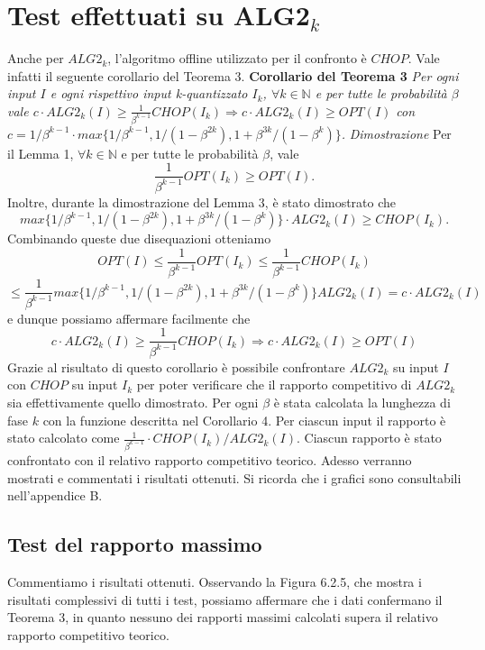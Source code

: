\documentclass[twoside,openany,titlepage,fleqn,
	headinclude,12pt,a4paper,BCOR5mm,footinclude]{scrbook}
\newcommand*{\N}{\mathbb{N}}
\begin{document}
\section{Test effettuati su ALG2$_{k}$}
Anche per $ALG2_{k}$, l’algoritmo offline utilizzato per il confronto è $CHOP$. Vale infatti il seguente corollario del Teorema 3.
\newline\newline
\textbf{Corollario del Teorema 3}
\textit{Per ogni input $I$ e ogni rispettivo input k-quantizzato $I_{k}$, $\forall k \in \N$ e per tutte le probabilità $\beta$ vale
$c \cdot ALG2_{k}(I) \geq \frac{1}{\beta^{k-1}} CHOP(I_{k}) \Longrightarrow c \cdot ALG2_{k}(I) \geq OPT(I)$ con $c = 1 / \beta^{k - 1} \cdot max \{1 / \beta^{k - 1}, 1 / (1 - \beta^{2k}), 1 + \beta^{3k} / (1 - \beta^{k})\}$.}
\newline \newline
\textit{Dimostrazione} 
Per il Lemma 1, $\forall k \in \N$ e per tutte le probabilità $\beta$, vale $$\frac{1}{\beta^{k-1}} OPT(I_{k}) \geq OPT(I).$$
Inoltre, durante la dimostrazione del Lemma 3, è stato dimostrato che $$max \{1 / \beta^{k - 1}, 1 / (1 - \beta^{2k}), 1 + \beta^{3k} / (1 - \beta^{k})\} \cdot ALG2_{k}(I) \geq CHOP(I_{k}).$$
Combinando queste due disequazioni otteniamo
$$OPT(I) \leq \frac{1}{\beta^{k-1}} OPT(I_{k}) \leq \frac{1}{\beta^{k-1}} CHOP(I_{k})$$ 
$$\leq \frac{1}{\beta^{k-1}} max \{1 / \beta^{k - 1}, 1 / (1 - \beta^{2k}), 1 + \beta^{3k} / (1 - \beta^{k})\} ALG2_{k}(I) = c \cdot ALG2_{k}(I)$$
e dunque possiamo affermare facilmente che 
\begin{equation}
c \cdot ALG2_{k}(I) \geq \frac{1}{\beta^{k-1}} CHOP(I_{k}) \Longrightarrow c \cdot ALG2_{k}(I) \geq OPT(I)  \tag*{$\square$}
\end{equation}
Grazie al risultato di questo corollario è possibile confrontare $ALG2_{k}$ su input $I$ con $CHOP$ su input $I_{k}$ per poter verificare che il rapporto competitivo di $ALG2_{k}$ sia effettivamente quello dimostrato. Per ogni $\beta$ è stata calcolata la lunghezza di fase $k$ con la funzione descritta nel Corollario 4. Per ciascun input il rapporto è stato calcolato come $\frac{1}{\beta^{k-1}} \cdot CHOP(I_{k}) / ALG2_{k}(I)$. Ciascun rapporto è stato confrontato con il relativo rapporto competitivo teorico. Adesso verranno mostrati e commentati i risultati ottenuti. Si ricorda che i grafici sono consultabili nell'appendice B.
\subsection{Test del rapporto massimo}
Commentiamo i risultati ottenuti. Osservando la Figura 6.2.5, che mostra i risultati complessivi di tutti i test, possiamo affermare che i dati confermano il Teorema 3, in quanto nessuno dei rapporti massimi calcolati supera il relativo rapporto competitivo teorico.
\end{document}
